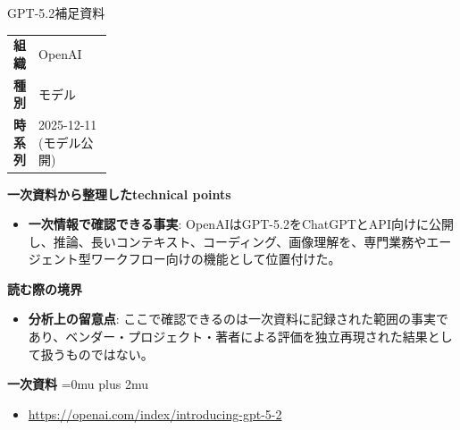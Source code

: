 \begin{technicalnote}{GPT-5.2}{補足資料}
\begingroup
\begin{tabularx}{\linewidth}{@{}>{\bfseries}p{0.22\linewidth}X@{}}
組織 & OpenAI \\
種別 & モデル \\
時系列 & 2025-12-11 (モデル公開) \\
\end{tabularx}
\smallskip
{\bfseries 一次資料から整理したtechnical points}
\begin{itemize}[leftmargin=1.5em,itemsep=0.35em]
\item \textbf{一次情報で確認できる事実}: OpenAIはGPT-5.2をChatGPTとAPI向けに公開し、推論、長いコンテキスト、コーディング、画像理解を、専門業務やエージェント型ワークフロー向けの機能として位置付けた。
\end{itemize}
\begin{minipage}{\linewidth}
{\bfseries 読む際の境界}
\begin{itemize}[leftmargin=1.5em,itemsep=0.35em]
\item \textbf{分析上の留意点}: ここで確認できるのは一次資料に記録された範囲の事実であり、ベンダー・プロジェクト・著者による評価を独立再現された結果として扱うものではない。
\end{itemize}
\begin{samepage}
{\bfseries 一次資料}
\begingroup\sloppy
\Urlmuskip=0mu plus 2mu\relax
\begin{itemize}[leftmargin=1.5em,itemsep=0.25em]
\item {\scriptsize\url{https://openai.com/index/introducing-gpt-5-2}}
\end{itemize}
\endgroup
\end{samepage}
\end{minipage}
\endgroup
\end{technicalnote}
\medskip

